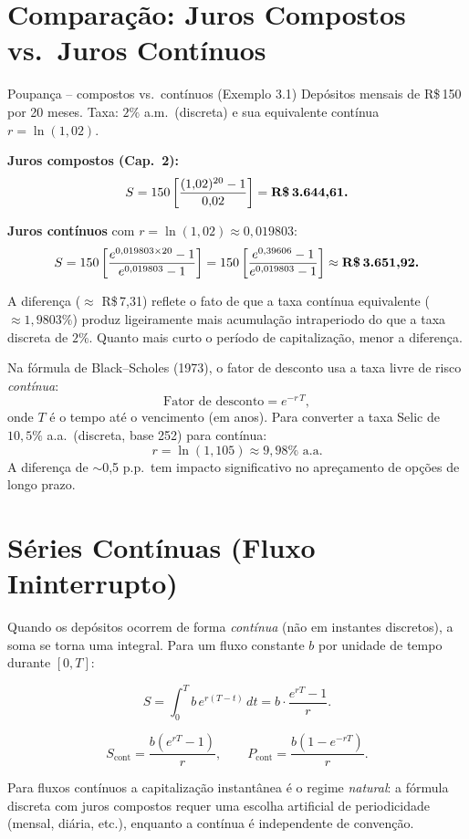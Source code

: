 \section{Comparação: Juros Compostos vs.\ Juros Contínuos}

\begin{exemplo}{Poupança -- compostos vs.\ contínuos (Exemplo 3.1)}
Depósitos mensais de R\$\,150 por 20 meses. Taxa: $2\%$ a.m.\ (discreta) e sua equivalente
contínua $r = \ln(1{,}02)$.

\medskip
\textbf{Juros compostos (Cap.\ 2):}
\[
  S = 150\left[\frac{(1{,}02)^{20}-1}{0{,}02}\right] = \textbf{R\$\,3.644{,}61.}
\]

\textbf{Juros contínuos} com $r = \ln(1{,}02) \approx 0{,}019803$:
\[
  S = 150\left[\frac{e^{0{,}019803 \times 20}-1}{e^{0{,}019803}-1}\right]
    = 150\left[\frac{e^{0{,}39606}-1}{e^{0{,}019803}-1}\right]
    \approx \textbf{R\$\,3.651{,}92.}
\]

A diferença ($\approx$ R\$\,7,31) reflete o fato de que a taxa contínua equivalente ($\approx 1{,}9803\%$)
produz ligeiramente mais acumulação intraperiodo do que a taxa discreta de $2\%$.
Quanto mais curto o período de capitalização, menor a diferença.
\end{exemplo}

\begin{moderno}[title={Pricing de opções e taxa contínua}]
Na fórmula de Black--Scholes (1973), o fator de desconto usa a taxa livre de risco \emph{contínua}:
\[
  \text{Fator de desconto} = e^{-r\,T},
\]
onde $T$ é o tempo até o vencimento (em anos). Para converter a taxa Selic de $10{,}5\%$ a.a.\
(discreta, base 252) para contínua:
\[
  r = \ln(1{,}105) \approx 9{,}98\% \text{ a.a.}
\]
A diferença de $\sim$0,5 p.p.\ tem impacto significativo no apreçamento de opções de longo prazo.
\end{moderno}

\section{Séries Contínuas (Fluxo Ininterrupto)}

Quando os depósitos ocorrem de forma \emph{contínua} (não em instantes discretos), a soma se
torna uma integral. Para um fluxo constante $b$ por unidade de tempo durante $[0, T]$:

\[
  S = \int_0^T b\, e^{r(T-t)}\, dt = b \cdot \frac{e^{rT} - 1}{r}.
\]

\begin{resultado}
\[
  S_{\text{cont}} = \frac{b(e^{rT}-1)}{r}, \qquad
  P_{\text{cont}} = \frac{b(1-e^{-rT})}{r}.
\]
\end{resultado}

\begin{obs}
Para fluxos contínuos a capitalização instantânea é o regime \emph{natural}: a fórmula discreta
com juros compostos requer uma escolha artificial de periodicidade (mensal, diária, etc.),
enquanto a contínua é independente de convenção.
\end{obs}
